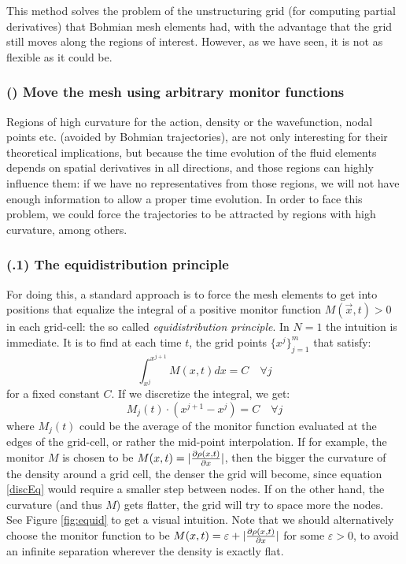 \documentclass[11pt, a4paper]{article} %
\begin{document}
This method solves the problem of the unstructuring grid (for computing partial derivatives) that Bohmian mesh elements had, with the advantage that the grid still moves along the regions of interest. However, as we have seen, it is not as flexible as it could be.

\subsubsection*{\bf (\textgamma) Move the mesh using arbitrary monitor functions } 
Regions of high curvature for the action, density or the wavefunction, nodal points etc. (avoided by Bohmian trajectories), are not only interesting for their theoretical implications, but because the time evolution of the fluid elements depends on spatial derivatives in all directions, and those regions can highly influence them: if we have no representatives from those regions, we will not have enough information to allow a proper time evolution. In order to face this problem, we could force the trajectories to be attracted by regions with high curvature, among others.

\subsubsection*{(\textgamma.1) The equidistribution principle}
For doing this, a standard approach is to force the mesh elements to get into positions that equalize the integral of a positive monitor function $M(\vec{x},t)>0$ in each grid-cell: the so called {\em equidistribution principle}. In $N=1$ the intuition is immediate. It is to find at each time $t$, the grid points $\{x^j\}_{j=1}^m$ that satisfy:
\begin{equation}
\int^{x^{j+1}}_{x^j} M(x,t) dx =C \quad \forall j
\end{equation}
for a fixed constant $C$. If we discretize the integral, we get:
\begin{equation}\label{discEq}
M_j(t)\cdot (x^{j+1}-x^j)=C \quad \forall j
\end{equation}
where $M_j(t)$ could be the average of the monitor function evaluated at the edges of the grid-cell, or rather the mid-point interpolation. If for example, the monitor $M$ is chosen to be $M(x,t)=|\pdv{\rho(x,t)}{x}|$, then the bigger the curvature of the density around a grid cell, the denser the grid will become, since equation \eqref{discEq} would require a smaller step between nodes. If on the other hand, the curvature (and thus $M$) gets flatter, the grid will try to space more the nodes. See Figure \ref{fig:equid} to get a visual intuition. Note that we should alternatively choose the monitor function to be $M(x,t)=\varepsilon+|\pdv{\rho(x,t)}{x}|$ for some $\varepsilon>0$, to avoid an infinite separation wherever the density is exactly flat. 
\end{document}
